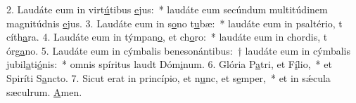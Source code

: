 2. Laudáte eum in virt\uline{ú}tibus \uline{e}jus:~* laudáte eum secúndum multitúdinem magnitúdnis \uline{e}jus.
3. Laudáte eum in s\uline{o}no t\uline{u}bæ:~* laudáte eum in psaltério, t cíth\uline{a}ra.
4. Laudáte eum in týmpan\uline{o}, et ch\uline{o}ro:~* laudáte eum in chordis, t órg\uline{a}no.
5. Laudáte eum in cýmbalis benesonántibus:~† laudáte eum in cýmbalis jubil\uline{a}ti\uline{ó}nis:~* omnis spíritus laudt Dóm\uline{i}num.
6. Glória P\uline{a}tri, et F\uline{í}lio,~* et Spiríti S\uline{a}ncto.
7. Sicut erat in princípio, et n\uline{u}nc, et s\uline{e}mper,~* et in sǽcula sæculrum. \uline{A}men.
